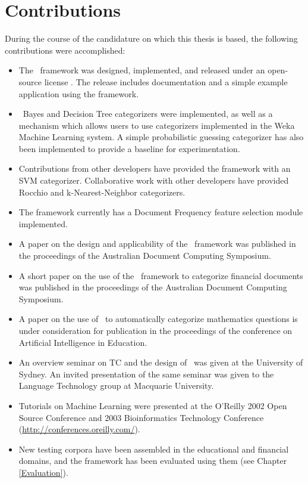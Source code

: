 \section{Contributions}

During the course of the candidature on which this thesis is based,
the following contributions were accomplished:

\begin{itemize}
\item The \aicat\ framework was designed, implemented, and released
  under an open-source license \cite{cpan}.  The release includes
  documentation and a simple example application using the framework.
\item \naive\ Bayes and Decision Tree categorizers were implemented,
  as well as a mechanism which allows users to use categorizers
  implemented in the Weka Machine Learning system\cite{weka:99}.  A
  simple probabilistic guessing categorizer has also been implemented
  to provide a baseline for experimentation.
\item Contributions from other developers have provided the framework
  with an SVM categorizer.  Collaborative work with other developers
  have provided Rocchio and k-Nearest-Neighbor categorizers.
\item The framework currently has a Document Frequency feature
  selection module implemented.
\item A paper on the design and applicability of the \aicat\ framework
  was published in the proceedings of the Australian Document
  Computing Symposium. \cite{williams:02}
\item A short paper on the use of the \aicat\ framework to categorize
  financial documents was published in the proceedings of the
  Australian Document Computing Symposium. \cite{calvo:02}
\item A paper on the use of \aicat\ to automatically categorize
  mathematics questions is under consideration for publication in the
  proceedings of the conference on Artificial Intelligence in
  Education.  \cite{williams:03}
\item An overview seminar on TC and the design of \aicat\ was given at
  the University of Sydney.  An invited presentation of the same
  seminar was given to the Language Technology group at Macquarie
  University.
\item Tutorials on Machine Learning were presented at the O'Reilly
  2002 Open Source Conference and 2003 Bioinformatics Technology
  Conference (\url{http://conferences.oreilly.com/}).
\item New testing corpora have been assembled in the educational and
  financial domains, and the framework has been evaluated using them
  (see Chapter \ref{Evaluation}).
\end{itemize}



